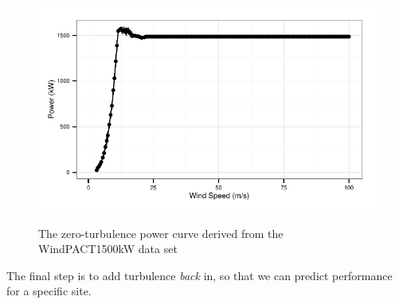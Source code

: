 \documentclass[nojss]{jss}\usepackage[]{graphicx}\usepackage[]{color}
\makeatletter
\newenvironment{kframe}{%
 \def\at@end@of@kframe{}%
 \ifinner\ifhmode%
  \def\at@end@of@kframe{\end{minipage}}%
  \begin{minipage}{\columnwidth}%
 \fi\fi%
 \def\FrameCommand##1{\hskip\@totalleftmargin \hskip-\fboxsep
 \colorbox{shadecolor}{##1}\hskip-\fboxsep
     \hskip-\linewidth \hskip-\@totalleftmargin \hskip\columnwidth}%
 \MakeFramed {\advance\hsize-\width
   \@totalleftmargin\z@ \linewidth\hsize
   \@setminipage}}%
 {\par\unskip\endMakeFramed%
 \at@end@of@kframe}
\newenvironment{knitrout}{}{} %
\makeatother
\begin{document}
\begin{knitrout}
\color{fgcolor}\begin{kframe}


{\ttfamily\noindent\color{warningcolor}{\#\# Warning in loop\_apply(n, do.ply): Removed 5 rows containing missing values (geom\_path).}}

{\ttfamily\noindent\color{warningcolor}{\#\# Warning in loop\_apply(n, do.ply): Removed 5 rows containing missing values (geom\_point).}}\end{kframe}\begin{figure}[h]

{\centering \includegraphics[width=5in,height=3in]{figure/ZTdemo-1} 

}

\caption[The zero-turbulence power curve derived from the WindPACT1500kW data set]{The zero-turbulence power curve derived from the WindPACT1500kW data set}\label{fig:ZTdemo}
\end{figure}


\end{knitrout}

The final step is to add turbulence \emph{back} in, so that we can predict performance for a specific site.
\end{document}

